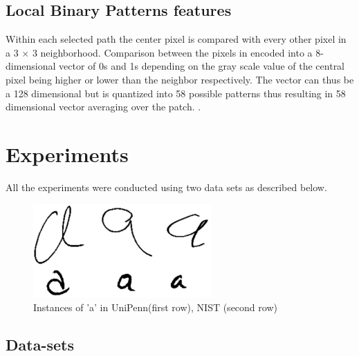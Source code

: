 \documentclass[runningheads]{llncs}
\begin{document}
\subsection{Local Binary Patterns features}
\label{ssec:lbp}
Within each selected path the center pixel is compared with every other pixel in a 3 $\times$ 3 neighborhood. Comparison between the pixels in encoded into a 8-dimensional vector of 0s and 1s depending on the gray scale value of the central pixel being higher or lower than the neighbor respectively. The vector can thus be a 128 dimensional but is quantized into 58 possible patterns thus resulting in 58 dimensional vector averaging over the patch. \cite{OPH94}.


\section{Experiments}
All the experiments were conducted using two data sets as described below.
\label{sec:exp}
\begin{figure}[t]

\begin{minipage}[b]{1.0\linewidth}
  \centering
  \centerline{\includegraphics[width=6.8cm,height=3.6cm]{data}}
\end{minipage}
\caption{Instances of 'a' in UniPenn(first row), NIST (second row)}
\label{fig:dataset}
%
\end{figure}

\subsection{Data-sets}
\label{ssec:data}
\end{document}
